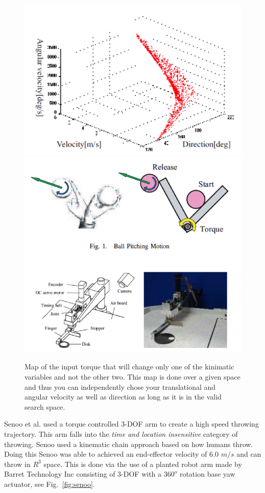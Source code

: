 \begin{figure}[thpb]
  \centering
\includegraphics[width=0.4\columnwidth]{./background/pix/mori2.png}\includegraphics[width=0.4\columnwidth]{./background/pix/mori1.png}
  \caption{Map of the input torque that will change only one of the kinimatic variables and not the other two.
This map is done over a given space and thus you can independently chose your translational and angular velocity as well as direction as long as it is in the valid search space.}
  \label{fig:mori}
\end{figure}


Senoo et al.\cite{4651142} used a torque controlled 3-DOF arm to create a high speed throwing trajectory.
This arm falls into the \textit{time and location insensitive} category of throwing.
Senoo used a kinematic chain approach based on how humans throw.  
Doing this Senoo was able to achieved an end-effector velocity of 6.0 $m/s$ and can throw in $R^3$ space.
This is done via the use of a planted robot arm made by Barret Technology Inc consisting of 3-DOF with a $360^o$ rotation base yaw actuator, see Fig.~\ref{fig:senoo}. 
 

